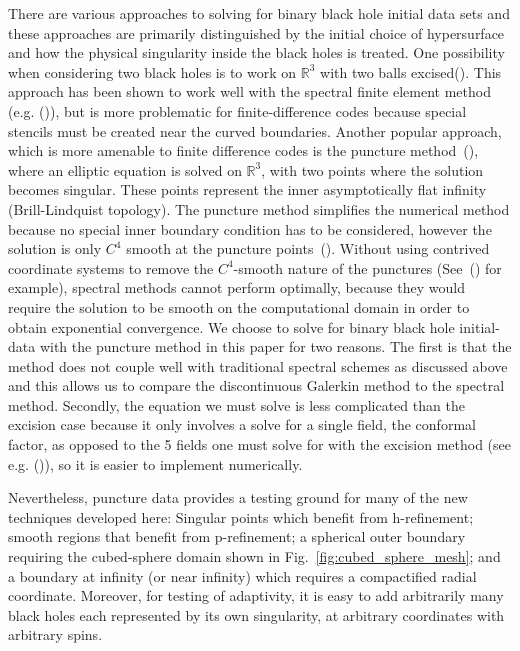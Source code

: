 There are various approaches to solving for binary black hole initial
data sets and these approaches are primarily distinguished by the
initial choice of hypersurface and how the physical singularity inside
the black holes is treated. One possibility when considering two black
holes is to work on $\mathbb{R}^{3}$ with two balls excised(\citet*{cook1994,cook2004excision,caudill2006circular}). This approach has
been shown to work well with the spectral finite element method
(e.g. (\citet*{pfeiffer2003multidomain})), but is more problematic for
finite-difference codes because special stencils must be created near
the curved boundaries. Another popular approach, which is more
amenable to finite difference codes is the puncture method~(\citet*{brandt1997simple}),
where an elliptic equation is solved on $\mathbb{R}^3$, with
two points where the solution becomes singular.  These points represent
the inner asymptotically flat infinity (Brill-Lindquist
topology).   The puncture
method simplifies the numerical method because no special inner
boundary condition has to be considered, however the solution is only
$C^4$ smooth at the puncture points~(\citet*{brandt1997simple}). Without using contrived
coordinate systems to remove the $C^4$-smooth nature of the
punctures (See~(\citet*{ansorg2004single}) for example), spectral methods
cannot perform optimally, because they would require the solution to
be smooth on the computational domain in order to obtain exponential
convergence. We choose to solve for binary black hole initial-data
with the puncture method in this paper for two reasons. The first is
that the method does not couple well with traditional spectral schemes
as discussed above and this allows us to compare the discontinuous
Galerkin method to the spectral method. Secondly, the equation we must
solve is less complicated than the excision case because it only
involves a solve for a single field, the conformal factor, as opposed
to the 5 fields one must solve for with the excision method (see
e.g. (\citet*{pfeiffer2003multidomain})), so it is easier to implement
numerically.

Nevertheless, puncture data provides a testing ground for many
  of the new techniques developed here: Singular points which benefit
  from h-refinement; smooth regions that benefit from p-refinement; a
  spherical outer boundary requiring the cubed-sphere domain shown in
  Fig.~\ref{fig:cubed_sphere_mesh}; and a boundary at infinity (or
  near infinity) which requires a compactified radial coordinate.
  Moreover, for testing of adaptivity, it is easy to add arbitrarily
  many black holes each represented by its own singularity, at
  arbitrary coordinates with arbitrary spins.

